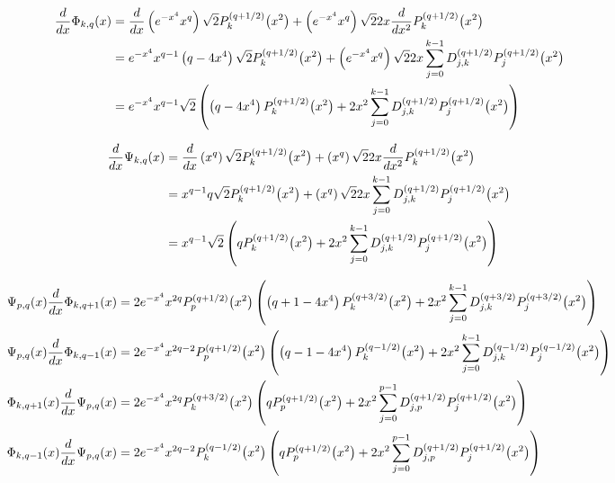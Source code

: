 \documentclass{article}[draft]
\begin{document}
\begin{align*}
\frac{d}{dx} \Phi_{k,q} \of{x} 
&= 
\frac{d}{dx} \left( e^{-x^4} x^q \right) \sqrt{2} \maxp{q+1/2}{k}\of{x^2}
+ \left( e^{-x^4} x^q \right) \sqrt{2} 2 x \frac{d}{dx^2} \maxp{q+1/2}{k}\of{x^2}
\\
&= 
e^{-x^4} x^{q-1} \left( q - 4 x^4 \right) \sqrt{2} \maxp{q+1/2}{k}\of{x^2}
+ \left( e^{-x^4} x^q \right) \sqrt{2} 2 x \sum_{j=0}^{k-1} \diffm{q+1/2}{j}{k} \maxp{q+1/2}{j}\of{x^2}
\\
&= 
e^{-x^4} x^{q-1} \sqrt{2} \left( \left( q - 4 x^4 \right) \maxp{q+1/2}{k}\of{x^2}
+ 2 x^2 \sum_{j=0}^{k-1} \diffm{q+1/2}{j}{k} \maxp{q+1/2}{j}\of{x^2} \right)
\end{align*}


\begin{align*}
\frac{d}{dx} \Psi_{k,q} \of{x} 
&= 
\frac{d}{dx} \left(  x^q \right) \sqrt{2} \maxp{q+1/2}{k}\of{x^2}
+ \left( x^q \right) \sqrt{2} 2 x \frac{d}{dx^2} \maxp{q+1/2}{k}\of{x^2}
\\
&= 
x^{q-1} q \sqrt{2} \maxp{q+1/2}{k}\of{x^2}
+ \left( x^q \right) \sqrt{2} 2 x \sum_{j=0}^{k-1} \diffm{q+1/2}{j}{k} \maxp{q+1/2}{j}\of{x^2}
\\
&= 
x^{q-1} \sqrt{2} \left( q \maxp{q+1/2}{k}\of{x^2}
+ 2 x^2 \sum_{j=0}^{k-1} \diffm{q+1/2}{j}{k} \maxp{q+1/2}{j}\of{x^2} \right)
\end{align*}

\begin{align*}
\Psi_{p,q}\of{x} \frac{d}{dx} \Phi_{k,q+1}\of{x} 
&= 2 e^{-x^4} x^{2q} \maxp{q+1/2}{p}\of{x^2} \left( \left( q+1 - 4 x^4 \right) \maxp{q+3/2}{k}\of{x^2}
+ 2 x^2 \sum_{j=0}^{k-1} \diffm{q+3/2}{j}{k} \maxp{q+3/2}{j}\of{x^2} \right)
\\
\Psi_{p,q}\of{x} \frac{d}{dx} \Phi_{k,q-1}\of{x} 
&= 
2 e^{-x^4} x^{2q-2} \maxp{q+1/2}{p}\of{x^2} \left( \left( q-1 - 4 x^4 \right) \maxp{q-1/2}{k}\of{x^2}
+ 2 x^2 \sum_{j=0}^{k-1} \diffm{q-1/2}{j}{k} \maxp{q-1/2}{j}\of{x^2} \right)
\\
\Phi_{k,q+1}\of{x} \frac{d}{dx} \Psi_{p,q}\of{x}
&= 2e^{-x^4} x^{2q} \maxp{q+3/2}{k}\of{x^2} 
\left( q \maxp{q+1/2}{p}\of{x^2}
+ 2 x^2 \sum_{j=0}^{p-1} \diffm{q+1/2}{j}{p} \maxp{q+1/2}{j}\of{x^2} \right)
\\
\Phi_{k,q-1}\of{x} \frac{d}{dx} \Psi_{p,q}\of{x}
&= 2e^{-x^4} x^{2q-2} \maxp{q-1/2}{k}\of{x^2} 
\left( q \maxp{q+1/2}{p}\of{x^2}
+ 2 x^2 \sum_{j=0}^{p-1} \diffm{q+1/2}{j}{p} \maxp{q+1/2}{j}\of{x^2} \right)
\end{align*}
\end{document}
